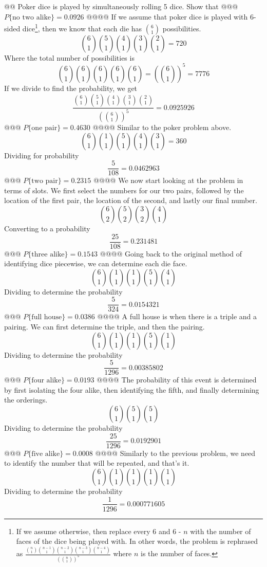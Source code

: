 \documentclass[10pt]{article}
\begin{document}
\begin{easylist}[enumerate]
    @@ Poker dice is played by simultaneously rolling 5 dice. Show that
    @@@ $ P\{\text{no two alike}\} = 0.0926 $
    @@@@ If we assume that poker dice is played with 6-sided dice\footnote{If we assume otherwise, then replace every 6 and 6 - $n$ with the number of faces of the dice being played with. In other words, the problem is rephrased as $\frac{\binom{n}{1} \binom{n - 1}{1} \binom{n - 2}{1} \binom{n - 3}{1} \binom{n - 4}{1}}{{\left( \binom{n}{1} \right)}^5} $ where $n$ is the number of faces.}, then we know that each die has $\binom{6}{1}$ possibilities.
        \[ \binom{6}{1} \binom{5}{1} \binom{4}{1} \binom{3}{1} \binom{2}{1} = 720\]
        Where the total number of possibilities is
        \[ \binom{6}{1} \binom{6}{1} \binom{6}{1} \binom{6}{1} \binom{6}{1} = {\left( \binom{6}{1} \right)}^5 = 7776 \]
        If we divide to find the probability, we get
        \[ \frac{\binom{6}{1} \binom{5}{1} \binom{4}{1} \binom{3}{1} \binom{2}{1}}{{\left( \binom{6}{1} \right)}^5} = \boxed{0.0925926} \]
    @@@ $ P\{\text{one pair}\} = 0.4630 $
    @@@@ Similar to the poker problem above.
        \[ \binom{6}{1} \binom{1}{1} \binom{5}{1} \binom{4}{1} \binom{3}{1} = 360 \]
        Dividing for probability
        \[ \frac{5}{108} = \boxed{0.0462963} \]
    @@@ $ P\{\text{two pair}\} = 0.2315 $
    @@@@ We now start looking at the problem in terms of slots. We first select the numbers for our two pairs, followed by the location of the first pair, the location of the second, and lastly our final number.
        \[ \binom{6}{2} \binom{5}{2} \binom{3}{2} \binom{4}{1} \]
        Converting to a probability
        \[ \frac{25}{108} = \boxed{0.231481} \]
    @@@ $ P\{\text{three alike}\} = 0.1543 $
    @@@@ Going back to the original method of identifying dice piecewise, we can determine each die face.
        \[ \binom{6}{1} \binom{1}{1} \binom{1}{1} \binom{5}{1} \binom{4}{1} \]
        Dividing to determine the probability
        \[ \frac{5}{324} = \boxed{0.0154321} \]
    @@@ $ P\{\text{full house}\} = 0.0386 $
    @@@@ A full house is when there is a triple and a pairing. We can first determine the triple, and then the pairing.
        \[ \binom{6}{1} \binom{1}{1} \binom{1}{1} \binom{5}{1} \binom{1}{1} \]
        Dividing to determine the probability
        \[ \frac{5}{1296} = \boxed{0.00385802} \]
    @@@ $ P\{\text{four alike}\} = 0.0193 $
    @@@@ The probability of this event is determined by first isolating the four alike, then identifying the fifth, and finally determining the orderings.
        \[ \binom{6}{1} \binom{5}{1} \binom{5}{1} \]
        Dividing to determine the probability
        \[ \frac{25}{1296} = \boxed{0.0192901} \]
    @@@ $ P\{\text{five alike}\} = 0.0008 $
    @@@@ Similarly to the previous problem, we need to identify the number that will be repeated, and that's it.
        \[ \binom{6}{1} \binom{1}{1} \binom{1}{1} \binom{1}{1} \binom{1}{1} \]
        Dividing to determine the probability
        \[ \frac{1}{1296} = \boxed{0.000771605} \]


\end{easylist}
\end{document}

